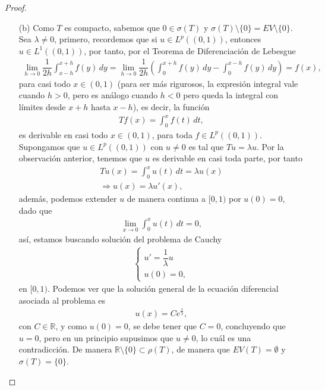 \begin{proof}
\begin{enumerate}
        \item[(b)] Como $T$ es compacto, sabemos que $0\in\sigma(T)$ y $\sigma(T)\setminus \{0\}=EV\setminus \{0\}$. Sea $\lambda\neq 0$, primero, recordemos que si $u \in L^p((0,1))$, entonces $u \in L^1((0,1))$, por tanto, por el Teorema de Diferenciación de Lebesgue
        \begin{align*}
            \lim_{h\to 0}\dfrac{1}{2h}\int_{x-h}^{x+h}f(y)\, dy=\lim_{h\to 0}\dfrac{1}{2h}\left(\int_0^{x+h}f(y)\, dy-\int_{0}^{x-h}f(y)\, dy\right)=f(x),
        \end{align*}
        para casi todo $x \in (0,1)$ (para ser más rigurosos, la expresión integral vale cuando $h>0$, pero es análogo cuando $h<0$ pero queda la integral con límites desde $x+h$ hasta $x-h$), es decir, la función
        \begin{align*}
            Tf(x)=\int_0^x f(t)\, dt,
        \end{align*}
        es derivable en casi todo $x \in (0,1)$, para toda $f \in L^p((0,1))$. Supongamos que $u \in L^p((0,1))$ con $u \neq 0$ es tal que $Tu=\lambda u$. Por la observación anterior, tenemos que $u$ es derivable en casi toda parte, por tanto
        \begin{align*}
            Tu(x)=\int_0^x u(t)\, dt=\lambda u(x)\\
            \Longrightarrow u(x)=\lambda u'(x),
        \end{align*}
        además, podemos extender $u$ de manera continua a $[0,1)$ por $u(0)=0$, dado que
        \begin{align*}
            \lim_{x\to 0}\int_0^x u(t)\, dt=0,
        \end{align*}
        así, estamos buscando solución del problema de Cauchy
        \begin{align*}
            \begin{cases}
                u'=\dfrac{1}{\lambda}u\\
                u(0)=0,
            \end{cases}
        \end{align*}
        en $[0,1)$. Podemos ver que la solución general de la ecuación diferencial asociada al problema es
        \begin{align*}
            u(x)=Ce^{\frac{x}{\lambda}},
        \end{align*}
        con $C \in \mathbb{R}$, y como $u(0)=0$, se debe tener que $C=0$, concluyendo que $u=0$, pero en un principio supusimos que $u\neq 0$, lo cuál es una contradicción. De manera $\mathbb{R}\setminus \{0\} \subset \rho(T)$, de manera que $EV(T)=\emptyset$ y $\sigma(T)=\{0\}$.
        


\end{enumerate}
\end{proof}
